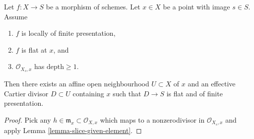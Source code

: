\begin{lemma}
\label{lemma-slice-once}
Let $f : X \to S$ be a morphism of schemes.
Let $x \in X$ be a point with image $s \in S$.
Assume
\begin{enumerate}
\item $f$ is locally of finite presentation,
\item $f$ is flat at $x$, and
\item $\mathcal{O}_{X_s, x}$ has $\text{depth} \geq 1$.
\end{enumerate}
Then there exists an affine open neighbourhood $U \subset X$ of $x$
and an effective Cartier divisor $D \subset U$ containing $x$ such that
$D \to S$ is flat and of finite presentation.
\end{lemma}

\begin{proof}
Pick any $h \in \mathfrak m_x \subset \mathcal{O}_{X, x}$ which
maps to a nonzerodivisor in $\mathcal{O}_{X_s, x}$ and apply
Lemma \ref{lemma-slice-given-element}.
\end{proof}
